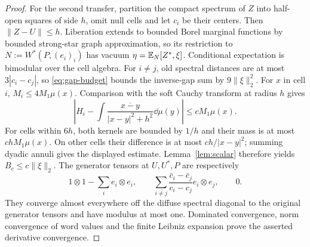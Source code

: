 \begin{proof}
For the second transfer, partition the compact spectrum of $Z$ into half-open squares of side $h$, omit null cells and let $c_i$ be their centers.
Then $\|Z-U\|\le h$.
Liberation extends to bounded Borel marginal functions by bounded strong-star graph approximation, so its restriction to $N:=W^*(P,(e_i)_i)$ has vacuum $\eta=\mathbb E_N[Z^*,\xi]$.
Conditional expectation is bimodular over the cell algebra.
For $i\ne j$, old spectral distances are at most $3|c_i-c_j|$, so \eqref{eq:gap-budget} bounds the inverse-gap sum by $9\|\xi\|_2^2$.
For $x$ in cell $i$, $M_i\le4M_1\mu(x)$.
Comparison with the soft Cauchy transform at radius $h$ gives
\[
 \left|H_i-\int\frac{\overline{x-y}}{|x-y|^2+h^2}\dd\mu(y)\right|
 \le cM_1\mu(x).
\]
For cells within $6h$, both kernels are bounded by $1/h$ and their mass is at most $chM_1\mu(x)$.
On other cells their difference is at most $ch/|x-y|^2$; summing dyadic annuli gives the displayed estimate.
Lemma~\ref{lem:scalar} therefore yields $B_c\le c\|\xi\|_2$.
The generator tensors at $U,U^*,P$ are respectively
\[
 1\otimes1-\sum_ie_i\otimes e_i,\qquad
 \sum_{i\ne j}\frac{\bar c_i-\bar c_j}{c_i-c_j}e_i\otimes e_j,\qquad0.
\]
They converge almost everywhere off the diffuse spectral diagonal to the original generator tensors and have modulus at most one.
Dominated convergence, norm convergence of word values and the finite Leibniz expansion prove the asserted derivative convergence.
\end{proof}

